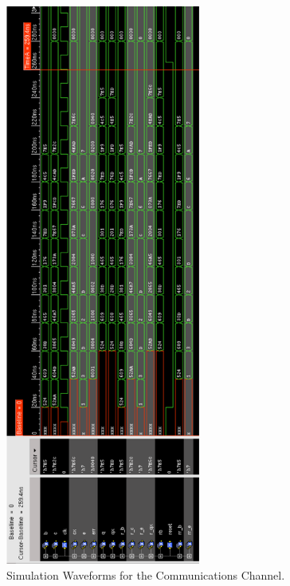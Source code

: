 \documentclass[ee577b,acmnow]{acmtrans2m}
\begin{document}
\hspace{-2cm}\begin{figure}
\begin{center}
\includegraphics[height=18.5cm]{prefinal}
\caption{Simulation Waveforms for the Communications Channel.}
\label{pref}
\end{center}
\end{figure}
\end{document}

